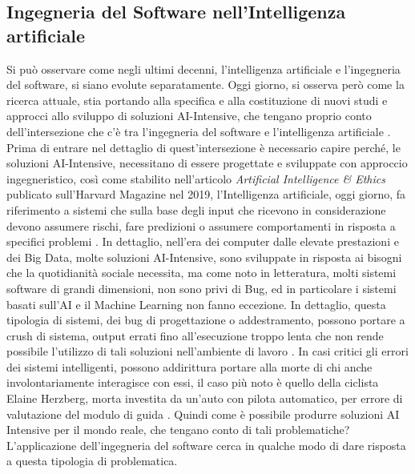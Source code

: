\subsection{Ingegneria del Software nell'Intelligenza artificiale}

Si può osservare come negli ultimi decenni, l'intelligenza artificiale e l'ingegneria del software, si siano evolute separatamente. Oggi giorno, si osserva però come la ricerca attuale, stia portando alla specifica e alla costituzione di nuovi studi e approcci allo sviluppo di soluzioni AI-Intensive, che tengano proprio conto dell'intersezione che c'è tra l'ingegneria del software e l'intelligenza artificiale \cite{rech2004artificial}. \\

Prima di entrare nel dettaglio di quest'intersezione è necessario capire perché, le soluzioni AI-Intensive, necessitano di essere progettate e sviluppate con approccio ingegneristico, così come stabilito nell'articolo \textit{Artificial Intelligence \& Ethics} publicato sull'Harvard Magazine nel 2019, l'Intelligenza artificiale, oggi giorno, fa riferimento a sistemi che sulla base degli input che ricevono in considerazione devono assumere rischi, fare predizioni o assumere comportamenti in risposta a specifici problemi \cite{shaw2019artificial}. In dettaglio, nell'era dei computer dalle elevate prestazioni e dei Big Data, molte soluzioni AI-Intensive, sono sviluppate in risposta ai bisogni che la quotidianità sociale necessita, ma come noto in letteratura, molti sistemi software di grandi dimensioni, non sono privi di Bug, ed in particolare i sistemi basati sull'AI e il Machine Learning non fanno eccezione. In dettaglio, questa tipologia di sistemi, dei bug di progettazione o addestramento, possono portare a crush di sistema, output errati fino all'esecuzione troppo lenta che non rende possibile l'utilizzo di tali soluzioni nell'ambiente di lavoro \cite{ML&Bugs}. In casi critici gli errori dei sistemi intelligenti, possono addirittura portare alla morte di chi anche involontariamente interagisce con essi, il caso più noto è quello della ciclista Elaine Herzberg, morta investita da un'auto con pilota automatico, per errore di valutazione del modulo di guida \cite{shaw2019artificial}. Quindi come è possibile produrre soluzioni AI Intensive per il mondo reale, che tengano conto di tali problematiche? L'applicazione dell'ingegneria del software cerca in qualche modo di dare risposta a questa tipologia di problematica.\\


